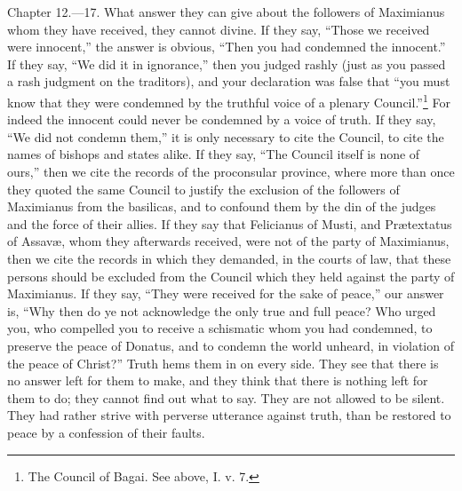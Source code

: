 
Chapter 12.—17. What answer they can give about the followers of Maximianus whom they have received, they cannot divine. If they say, ``Those we received were innocent,'' the answer is obvious, ``Then you had condemned the innocent.'' If they say, ``We did it in ignorance,'' then you judged rashly (just as you passed a rash judgment on the traditors), and your declaration was false that ``you must know that they were condemned by the truthful voice of a plenary Council.''\footnote{\par  The Council of Bagai. See above, I. v. 7.} For indeed the innocent could never be condemned by a voice of truth. If they say, ``We did not condemn them,'' it is only necessary to cite the Council, to cite the names of bishops and states alike. If they say, ``The Council itself is none of ours,'' then we cite the records of the proconsular province, where more than once they quoted the same Council to justify the exclusion of the followers of Maximianus from the basilicas, and to confound them by the din of the judges and the force of their allies. If they say that Felicianus of Musti, and Prætextatus of Assavæ, whom they afterwards received, were not of the party of Maximianus, then we cite the records in which they demanded, in the courts of law, that these persons should be excluded from the Council which they held against the party of Maximianus. If they say, ``They were received for the sake of peace,'' our answer is, ``Why then do ye not acknowledge the only true and full peace? Who urged you, who compelled you to receive a schismatic whom you had condemned, to preserve the peace of Donatus, and to condemn the world unheard, in violation of the peace of Christ?'' Truth hems them in on every side. They see that there is no answer left for them to make, and they think that there is nothing left for them to do; they cannot find out what to say. They are not allowed to be silent. They had rather strive with perverse utterance against truth, than be restored to peace by a confession of their faults.


